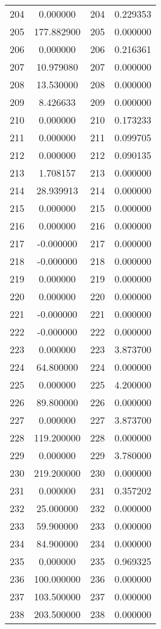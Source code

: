\documentclass[12pt]{article}
\begin{document}
\begin{longtable}{@{}cccc@{}}
204 & 0.000000 & 204 & 0.229353 \\
205 & 177.882900 & 205 & 0.000000 \\
206 & 0.000000 & 206 & 0.216361 \\
207 & 10.979080 & 207 & 0.000000 \\
208 & 13.530000 & 208 & 0.000000 \\
209 & 8.426633 & 209 & 0.000000 \\
210 & 0.000000 & 210 & 0.173233 \\
211 & 0.000000 & 211 & 0.099705 \\
212 & 0.000000 & 212 & 0.090135 \\
213 & 1.708157 & 213 & 0.000000 \\
214 & 28.939913 & 214 & 0.000000 \\
215 & 0.000000 & 215 & 0.000000 \\
216 & 0.000000 & 216 & 0.000000 \\
217 & -0.000000 & 217 & 0.000000 \\
218 & -0.000000 & 218 & 0.000000 \\
219 & 0.000000 & 219 & 0.000000 \\
220 & 0.000000 & 220 & 0.000000 \\
221 & -0.000000 & 221 & 0.000000 \\
222 & -0.000000 & 222 & 0.000000 \\
223 & 0.000000 & 223 & 3.873700 \\
224 & 64.800000 & 224 & 0.000000 \\
225 & 0.000000 & 225 & 4.200000 \\
226 & 89.800000 & 226 & 0.000000 \\
227 & 0.000000 & 227 & 3.873700 \\
228 & 119.200000 & 228 & 0.000000 \\
229 & 0.000000 & 229 & 3.780000 \\
230 & 219.200000 & 230 & 0.000000 \\
231 & 0.000000 & 231 & 0.357202 \\
232 & 25.000000 & 232 & 0.000000 \\
233 & 59.900000 & 233 & 0.000000 \\
234 & 84.900000 & 234 & 0.000000 \\
235 & 0.000000 & 235 & 0.969325 \\
236 & 100.000000 & 236 & 0.000000 \\
237 & 103.500000 & 237 & 0.000000 \\
238 & 203.500000 & 238 & 0.000000 \\

\end{longtable}
\end{document}
